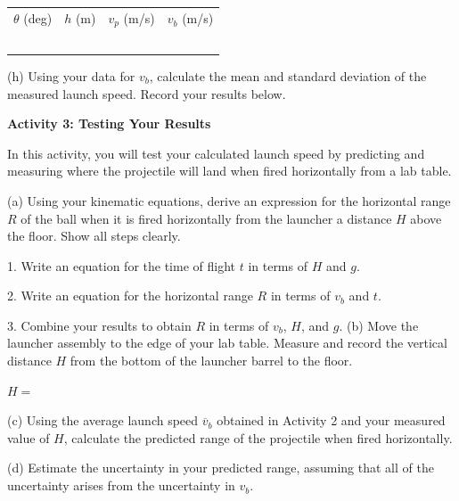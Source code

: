 \begin{center}
{\renewcommand{\arraystretch}{2.0}
\begin{tabular}{|c|c|C{0.8in}|C{0.8in}|} \hline 
$\theta$ (deg) & $h$ (m) & $v_p$ (m/s) & $v_b$ (m/s) \\ 
\hhline{|=|=|=|=|}
& & & \\ \hline 
& & & \\ \hline 
& & & \\ \hline 
& & & \\ \hline 
& & & \\ \hline  
\end{tabular} }
\end{center}
    
(h) Using your data for $v_b$, calculate the mean and standard deviation of the measured launch speed. Record your results below.
\answerspace{15mm}

\textbf{Activity 3: Testing Your Results}

In this activity, you will test your calculated launch speed by predicting and measuring where the projectile will land when fired horizontally from a lab table.

(a) Using your kinematic equations, derive an expression for the horizontal range $R$ of the ball when it is fired horizontally from the launcher a distance $H$ above the floor. Show all steps clearly.

1. Write an equation for the time of flight $t$ in terms of $H$ and $g$.
\answerspace{20mm}

2. Write an equation for the horizontal range $R$ in terms of $v_b$ and $t$.
\answerspace{20mm}

3. Combine your results to obtain $R$ in terms of $v_b$, $H$, and $g$.
\answerspace{20mm}
\newpage
(b) Move the launcher assembly to the edge of your lab table. Measure and record the vertical distance $H$ from the bottom of the launcher barrel to the floor.

\vspace{5mm}

\hspace{0.5in}\( H = \)
\answerspace{5mm}

(c) Using the average launch speed $\overline{v}_b$ obtained in Activity 2 and your measured value of $H$, calculate the predicted range of the projectile when fired horizontally.
\answerspace{35mm}

(d) Estimate the uncertainty in your predicted range, assuming that all of the uncertainty arises from the uncertainty in $v_b$.  
\answerspace{25mm}

